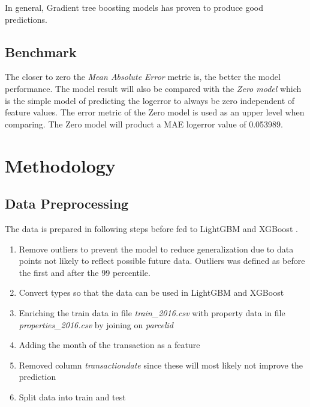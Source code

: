 \documentclass[a4paper]{article}
\begin{document}
In general, Gradient tree boosting models has proven to produce good predictions.

\subsection{Benchmark}
The closer to zero the \textit{Mean Absolute Error} metric is, the better the model performance. The model result will also be compared with the \textit{Zero model} which is the simple model of predicting the logerror to always be zero independent of feature values. The error metric of the Zero model is used as an upper level when comparing. The Zero model will product a MAE logerror value of 0.053989.


\section{Methodology}

\subsection{Data Preprocessing}
The data is prepared in following steps before fed to LightGBM \cite{lightgbm} and XGBoost \cite{xgboost}.
\begin{enumerate}
    \item Remove outliers to prevent the model to reduce generalization due to data points not likely to reflect possible future data. Outliers was defined as before the first and after the 99 percentile.
    \item Convert types so that the data can be used in LightGBM \cite{lightgbm} and XGBoost \cite{xgboost}
    \item Enriching the train data in file \textit{train\_2016.csv} with property data in file
        \textit{properties\_2016.csv} by joining on \textit{parcelid}
    \item Adding the month of the transaction as a feature
    \item Removed column \textit{transactiondate} since these will most likely not improve the prediction
    \item Split data into train and test
\end{enumerate}
\end{document}
